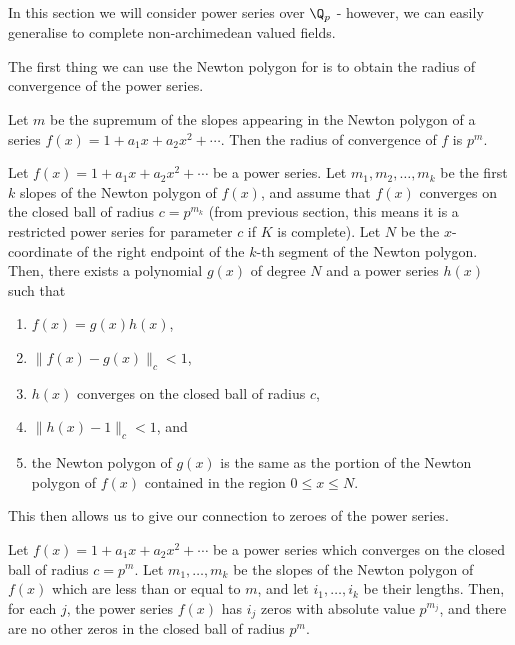 In this section we will consider power series over $\Q_p$ - however, we can easily generalise to
complete non-archimedean valued fields.

The first thing we can use the Newton polygon for is to obtain the radius of convergence of the
power series.

\begin{theorem} \label{RadofCon}
    Let $m$ be the supremum of the slopes appearing in the Newton polygon of a series
    $f(x) = 1 + a_1 x + a_2 x^2 + \cdots$. Then the radius of convergence of $f$ is $p^m.$
\end{theorem}



\begin{proposition}\label{NP}
    Let $f(x) = 1 + a_1 x + a_2 x^2 + \cdots$ be a power series. Let $m_1, m_2, \dots, m_k$ be the
    first $k$ slopes of the Newton polygon of $f(x)$, and assume that $f(x)$ converges on the
    closed ball of radius $c = p^{m_k}$ (from previous section, this means it is a restricted power
    series for parameter $c$ if $K$ is complete). Let $N$ be the $x$-coordinate of the right
    endpoint of the $k$-th segment of the Newton polygon. Then, there exists a polynomial
    $g(x)$ of degree $N$ and a power series $h(x)$ such that
    \begin{enumerate}
        \item $f(x) = g(x) h(x)$,
        \item $\| f(x) - g(x) \|_c < 1$,
        \item $h(x)$ converges on the closed ball of radius $c$,
        \item $\| h(x) - 1\|_c <1$, and
        \item the Newton polygon of $g(x)$ is the same as the portion of the Newton polygon of
        $f(x)$ contained in the region $0 \leq x \leq N$.
    \end{enumerate}
\end{proposition}

This then allows us to give our connection to zeroes of the power series.

\begin{corollary}
    Let $f(x) = 1 + a_1 x + a_2 x^2 + \cdots$ be a power series which converges on the closed ball
    of radius $c = p^m$. Let $m_1,\dots, m_k$ be the slopes of the Newton polygon of $f(x)$ which
    are less than or equal to $m$, and let $i_1,\dots,i_k$ be their lengths. Then, for each $j$, the
    power series $f(x)$ has $i_j$ zeros with absolute value $p^{m_j}$, and there are no other zeros
    in the closed ball of radius $p^m.$
\end{corollary}

